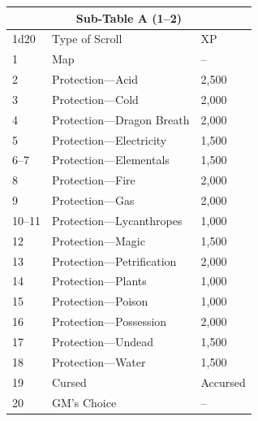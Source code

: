 \begin{multicols}{2}
\begin{minipage}{\columnwidth}
\label{scrollsa}
\noindent
\begin{tabular}{|p{}|p{}|p{}|}
\multicolumn{3}{c}{Sub-Table A (1--2)} \\ 
\hline
1d20	& Type of Scroll	& XP \\
\hline\hline
\rowcolor[gray]{.9}1	& Map	& -- \\
2	& Protection---Acid	& 2,500 \\
\rowcolor[gray]{.9}3	& Protection---Cold	& 2,000 \\
4	& Protection---Dragon Breath	& 2,000 \\
\rowcolor[gray]{.9}5	& Protection---Electricity	& 1,500 \\
6--7	& Protection---Elementals	& 1,500 \\
\rowcolor[gray]{.9}8	& Protection---Fire	& 2,000 \\
9	& Protection---Gas	& 2,000 \\
\rowcolor[gray]{.9}10--11	& Protection---Lycanthropes	& 1,000 \\
12	& Protection---Magic	& 1,500 \\
\rowcolor[gray]{.9}13	& Protection---Petrification	& 2,000 \\
14	& Protection---Plants	& 1,000 \\
\rowcolor[gray]{.9}15	& Protection---Poison	& 1,000 \\
16	& Protection---Possession	& 2,000 \\
\rowcolor[gray]{.9}17	& Protection---Undead	& 1,500 \\
18	& Protection---Water	& 1,500 \\
\rowcolor[gray]{.9}19	& Cursed	& Accursed \\
20	& GM's Choice	& -- \\
\hline
\end{tabular}

\end{minipage}


\end{multicols}
